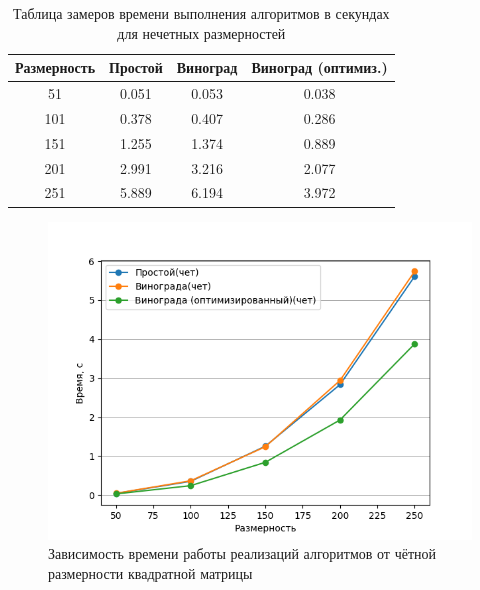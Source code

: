 \begin{table}[h]
	\caption{Таблица замеров времени выполнения алгоритмов в секундах для нечетных размерностей}
	\label{tbl:profilingalgs2}
	\begin{center}
		\begin{tabular}{|c|c|c|c|} 
		 	\hline
			Размерность & Простой & Виноград & Виноград (оптимиз.) \\  
		 	\hline
		 	51 & 0.051 & 0.053 & 0.038 \\
		 	\hline
		 	101 & 0.378 & 0.407 & 0.286 \\
		 	\hline
			151 & 1.255 & 1.374 & 0.889 \\
			\hline
			201 & 2.991 & 3.216 & 2.077 \\
			\hline
			251 & 5.889 & 6.194 & 3.972 \\
			\hline
		\end{tabular}
	\end{center}
\end{table}


\begin{figure}[h!]
	\centering
	\includegraphics[scale=0.95]{imgs/1.png}
	\caption{Зависимость времени работы реализаций алгоритмов от чётной размерности квадратной матрицы}
	\label{img:profiling1}
\end{figure}

